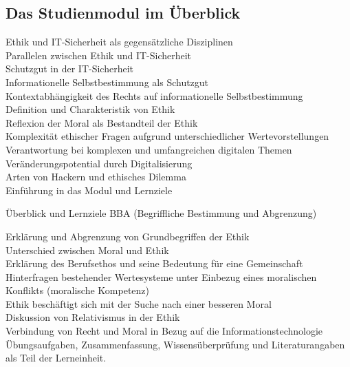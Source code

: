 \documentclass[journal]{IEEEtran}
\begin{document}

\begin{onecolumn}

\section{Das Studienmodul im Überblick}

Ethik und IT-Sicherheit als gegensätzliche Disziplinen
\\
Parallelen zwischen Ethik und IT-Sicherheit
\\
Schutzgut in der IT-Sicherheit
\\
Informationelle Selbstbestimmung als Schutzgut
\\
Kontextabhängigkeit des Rechts auf informationelle Selbstbestimmung
\\
Definition und Charakteristik von Ethik
\\
Reflexion der Moral als Bestandteil der Ethik
\\
Komplexität ethischer Fragen aufgrund unterschiedlicher Wertevorstellungen
\\
Verantwortung bei komplexen und umfangreichen digitalen Themen
\\
Veränderungspotential durch Digitalisierung
\\
Arten von Hackern und ethisches Dilemma
\\
Einführung in das Modul und Lernziele

\newpage

Überblick und Lernziele BBA (Begriffliche Bestimmung und Abgrenzung)
\\

\newpage

Erklärung und Abgrenzung von Grundbegriffen der Ethik
\\
Unterschied zwischen Moral und Ethik
\\
Erklärung des Berufsethos und seine Bedeutung für eine Gemeinschaft
\\
Hinterfragen bestehender Wertesysteme unter Einbezug eines moralischen Konflikts (moralische Kompetenz)
\\
Ethik beschäftigt sich mit der Suche nach einer besseren Moral
\\
Diskussion von Relativismus in der Ethik
\\
Verbindung von Recht und Moral in Bezug auf die Informationstechnologie
\\
Übungsaufgaben, Zusammenfassung, Wissensüberprüfung und Literaturangaben als Teil der Lerneinheit.


\end{onecolumn}
\end{document}
